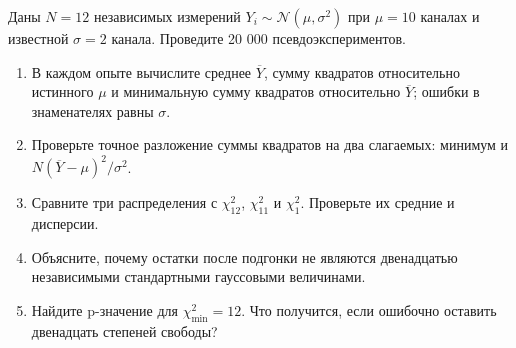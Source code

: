 \documentclass[
  russian,
  11pt,
  a4paper,
  open=any]{scrbook}
\providecommand{\tightlist}{%
  \setlength{\itemsep}{0pt}\setlength{\parskip}{0pt}}
\begin{document}
\begin{semanticpdfbox}[colback=BookCoralSoft,borderline west={1.2mm}{0pt}{BookCoral}]

\par\nopagebreak[4]\vspace{1.2mm}

Даны \(N=12\) независимых измерений \(Y_i\sim\mathcal N(\mu,\sigma^2)\)
при \(\mu=10\) каналах и известной \(\sigma=2\) канала. Проведите 20 000
псевдоэкспериментов.

\begin{enumerate}
\def\labelenumi{\arabic{enumi}.}
\tightlist
\item
  В каждом опыте вычислите среднее \(\overline Y\), сумму квадратов
  относительно истинного \(\mu\) и минимальную сумму квадратов
  относительно \(\overline Y\); ошибки в знаменателях равны \(\sigma\).
\item
  Проверьте точное разложение суммы квадратов на два слагаемых: минимум
  и \(N(\overline Y-\mu)^2/\sigma^2\).
\item
  Сравните три распределения с \(\chi^2_{12}\), \(\chi^2_{11}\) и
  \(\chi^2_1\). Проверьте их средние и дисперсии.
\item
  Объясните, почему остатки после подгонки не являются двенадцатью
  независимыми стандартными гауссовыми величинами.
\item
  Найдите p-значение для \(\chi^2_{\min}=12\). Что получится, если
  ошибочно оставить двенадцать степеней свободы?
\end{enumerate}

\end{semanticpdfbox}
\end{document}
